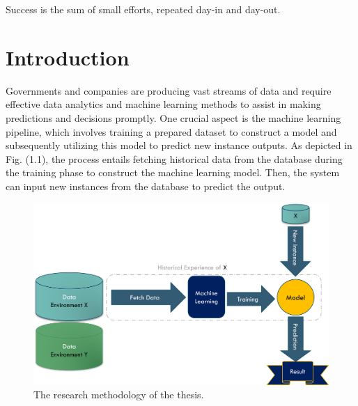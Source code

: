 



\begin{savequote}[50mm]
Success is the sum of small efforts, repeated day-in and day-out.
\end{savequote}

\chapter{Introduction}
\label{cha:1_Introduction}

\ifpdf
    \graphicspath{{1_introduction/figures/PNG/}{1_introduction/figures/PDF/}{1_introduction/figures/}}
\else
    \graphicspath{{1_introduction/figures/EPS/}{1_introduction/figures/}}
\fi



Governments and companies are producing vast streams of data and require effective data analytics and machine learning methods to assist in making predictions and decisions promptly. One crucial aspect is the machine learning pipeline, which involves training a prepared dataset to construct a model and subsequently utilizing this model to predict new instance outputs. As depicted in Fig. (1.1), the process entails fetching historical data from the database during the training phase to construct the machine learning model. Then, the system can input new instances from the database to predict the output.

\begin{figure}[!ht]
    \centering
    \includegraphics[width=.9\textwidth]{1_introduction/figures/PNG/machine_flow.png}
    \caption{The research methodology of the thesis.}
    \label{ch1:research-emthodo}
\end{figure}

